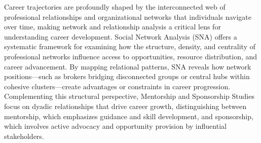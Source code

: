 \documentclass[./main.tex]{subfiles}
\begin{document}
Career trajectories are profoundly shaped by the interconnected web of professional relationships and organizational networks that individuals navigate over time, making network and relationship analysis a critical lens for understanding career development. Social Network Analysis (SNA) offers a systematic framework for examining how the structure, density, and centrality of professional networks influence access to opportunities, resource distribution, and career advancement. By mapping relational patterns, SNA reveals how network positions—such as brokers bridging disconnected groups or central hubs within cohesive clusters—create advantages or constraints in career progression. Complementing this structural perspective, Mentorship and Sponsorship Studies focus on dyadic relationships that drive career growth, distinguishing between mentorship, which emphasizes guidance and skill development, and sponsorship, which involves active advocacy and opportunity provision by influential stakeholders. 
\end{document}
